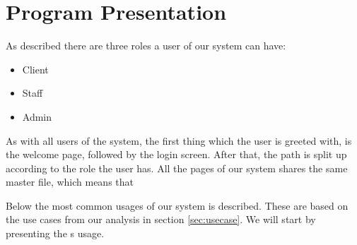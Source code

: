 \chapter{Program Presentation}
\label{chap:program_presentation}

As described there are three roles a user of our system can have:

\begin{itemize}
	\item Client
	\item Staff
	\item Admin
\end{itemize}

As with all users of the system, the first thing which the user is greeted with, is the welcome page, followed by the login screen.
After that, the path is split up according to the role the user has.
All the pages of our system shares the same master file, which means that 

Below the most common usages of our system is described.
These are based on the use cases from our analysis in section \ref{sec:usecase}.
We will start by presenting the \aclient[]s usage.







